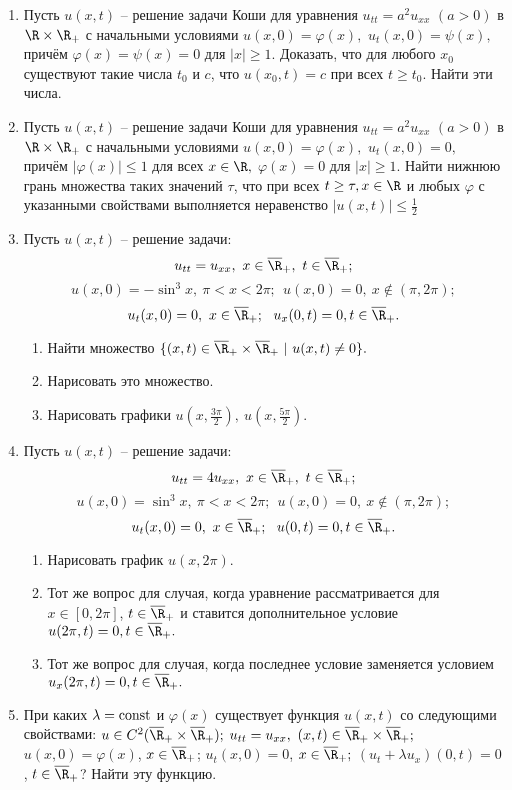 \documentclass[a4paper]{article}
\def\fy{\varphi}
\begin{document}
\begin{enumerate}
\item
Пусть $u(x,t)$ -- решение задачи Коши для уравнения $u_{tt}=a^2u_{xx}$
$(a>0)$ в $\R\times\R_+$ с начальными условиями $u(x,0)=\fy(x),$
$u_t(x,0)=\psi(x),$ причём $\fy(x)=\psi(x)=0$ для $|x|\ge1.$ Доказать,
что для любого $x_0$ существуют такие числа $t_0$ и $c$, что $u(x_0,t)=c$
при всех $t\ge t_0.$ Найти эти числа.

\item
Пусть $u(x,t)$ -- решение задачи Коши для уравнения $u_{tt}=a^2u_{xx}$
$(a>0)$ в $\R\times\R_+$ с начальными условиями $u(x,0)=\fy(x),$
$u_t(x,0)=0,$ прич\"ем $|\fy(x)|\le 1$ для всех $x\in\R,$ $\fy(x)=0$
для $|x|\ge1$. Найти нижнюю грань множества таких значений $\tau$, что
при всех $t\ge\tau, x\in\R$ и любых $\fy$ с указанными свойствами
выполняется неравенство $|u(x,t)|\le \displaystyle{\frac{1}{2}}$

\item
Пусть $u(x,t)$ -- решение задачи:
$$u_{tt}=u_{xx},\ x\in \overline{\R}_+,\ t\in\overline{\R}_+;$$
$$u(x,0)=- \sin^3x,\ \pi<x<2\pi;\ \ u(x,0)=0,\ x\notin(\pi,2\pi);$$
$$u_t(x,0)=0,\ x\in\overline{\R}_+;\ \ u_x(0,t)=0,
t\in\overline{\R}_+.$$
\begin{enumerate}
\item
Найти множество $\{(x,t)\in\overline{\R}_+\times\overline{\R}_+ \ |\
u(x,t)\neq0\}.$
\item
Нарисовать это множество.
\item
Нарисовать графики $u(x,\frac{3\pi}{2}), \ u(x,\frac{5\pi}{2}).$
\end{enumerate}

\item
Пусть $u(x,t)$ -- решение задачи:
$$u_{tt}=4u_{xx},\ x\in \overline{\R}_+,\ t\in\overline{\R}_+;$$
$$u(x,0)=\sin^3x,\ \pi<x<2\pi;\ \ u(x,0)=0,\ x\notin(\pi,2\pi);$$
$$u_t(x,0)=0,\ x\in\overline{\R}_+;\ \ u(0,t)=0,t\in\overline{\R}_+.$$
\begin{enumerate}
  \item
  Нарисовать график $u(x,2\pi).$
  \item
  Тот же вопрос для случая, когда уравнение рассматривается для
  $x\in [0,2\pi]$, $t\in\overline{\R}_+$ и ставится дополнительное условие
  $u(2\pi,t)=0, t\in\overline{\R}_+.$
  \item
  Тот же вопрос для случая, когда последнее условие заменяется условием
  $u_x(2\pi,t)=0, t\in\overline{\R}_+.$
\end{enumerate}

\item
При каких $\lambda=\hbox{const}$ и $\fy(x)$ существует функция $u(x,t)$
со следующими свойствами: $u\in C^2(\overline{\R}_+\times
\overline{\R}_+);$ $u_{tt}=u_{xx},\ (x,t)\in
\overline{\R}_+\times\overline{\R}_+;$
$u(x,0)=\fy(x)$, $x\in \overline{\R }_+$; $u_t(x,0)=0$,
$x\in \overline{\R}_+;$ $(u_t+\lambda u_x)(0,t)=0$, $t\in
\overline{\R}_+$? Найти эту функцию.


\end{enumerate}
\end{document}
